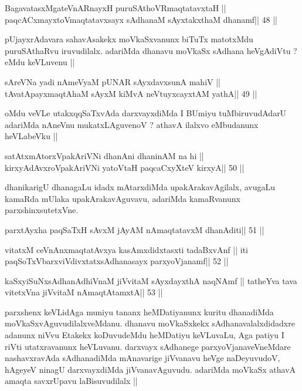 \begin{shl}
BagavatasxMgateVnARnayxH puruSAthoVR\s maqtatavxtaH ||
paqcACxmayxtoV\s maqtatavxsayx sAdhanaM sAyxtakxthaM dhanamf\hfill || 48 ||
\end{shl}

\begin{artha}
pUjayxrAdavara sahavAsakekx moVkaSxvanunx biTuTx matotxMdu puruSAthaRvu
iruvudilalx. adariMda dhanavu moVkaSx sAdhana heVgAdiVtu ? eMdu
keVLuvenu ||
\end{artha}

\begin{shl}
sAreVNa yadi nAmeVyaM pUNAR sAyxdavxsunA mahiV ||
tAvatA\s payxmaqtA\s haM sAyxM kiMvA neVtuyxcayxtAM yathA\hfill || 49 ||
\end{shl}

\begin{artha}
oMdu veVLe utakxqqSaTxvAda darxvayxdiMda I BUmiyu tuMbiruvudAdarU
adariMda nAneVnu mukatxLAguvenoV ? athavA ilalxvo eMbudanunx
heVLabeVku ||
\end{artha}

\begin{shl}
satAtxmAtorxVpakAriVNi dhanAni dhaninAM na hi ||
kirxyAdAvxroVpakAriVNi yatoV\s taH paqcaCxyXteV kirxyA\hfill || 50 ||
\end{shl}

\begin{artha}
dhanikarigU dhanagaLu idadx mAtarxdiMda upakArakavAgilalx, avugaLu
kamaRda mUlaka upakArakavAguvavu, adariMda kamaRvanunx
parxshinxsutetxVne.
\end{artha}


\begin{shl}
parxtAyxha paqSaTxH sAvxM jAyAM nAmaqtatavxM dhanAditi\hfill || 51 ||
\end{shl}

\begin{shl}
vitatxM ceVnAnxmaqtatAvxya kasAmxdidxtasxti tadaBxvAnf ||
iti paqSoTxV\s barxviVdivxtatxsAdhanasayx parxyoVjanamf\hfill || 52 ||
\end{shl}

\begin{shl}
kaSxyiSuNxsAdhanAdhiVnaM jiVvitaM sAyxdayxthA naqNAmf ||
tatheYva tava vitetxVna jiVvitaM nAmaqtAtamxtA\hfill || 53 ||
\end{shl}

\begin{artha}
parxshenx keVLidAga muniyu tananx heMDatiyanunx kuritu dhanadiMda
moVkaSxvAguvudilalxveMdanu. dhanavu moVkaSxkekx sAdhanavalalxdidadxre
adanunx niVvu Etakekx koDuvudeMdu heMDatiyu keVLuvaLu, Aga patiyu I
riVti utatxravanunx heVLuvanu. darxvayx sAdhanege parxyoVjanaveVneMdare 
nashavxravAda sAdhanadiMda mAnavarige jiVvanavu heVge naDeyuvudoV,
hAgeyeV ninagU darxvayxdiMda jiVvanavAguvudu. adariMda moVkaSx athavA
amaqta savxrUpavu laBisuvudilalx ||
\end{artha}

